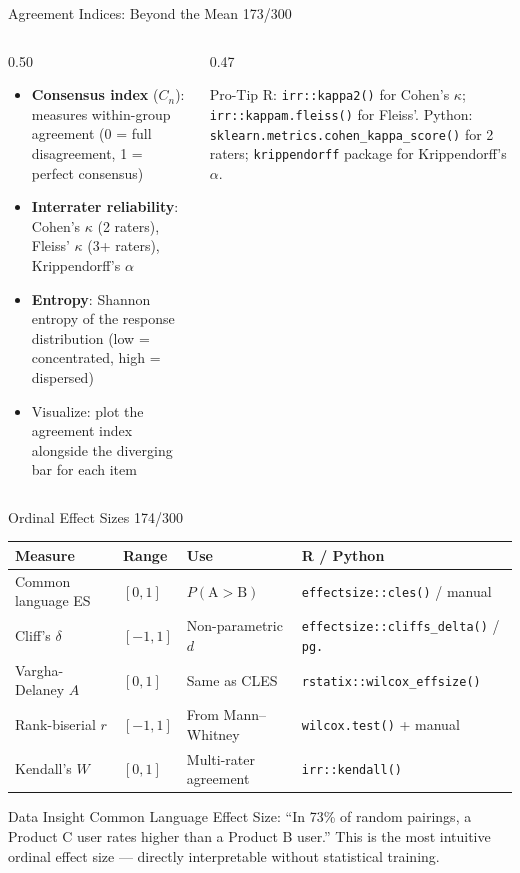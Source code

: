 \documentclass[10pt]{beamer}
\newcommand{\smark}[1]{\hfill{\scriptsize\color{codegray}#1}}
\begin{document}
\begin{frame}{Agreement Indices: Beyond the Mean}
\smark{173/300}
\begin{columns}[T]
\begin{column}{0.50\textwidth}
\begin{itemize}
    \item \textbf{Consensus index} ($C_n$): measures within-group agreement (0 = full disagreement, 1 = perfect consensus)
    \item \textbf{Interrater reliability}: Cohen's $\kappa$ (2 raters), Fleiss' $\kappa$ (3+ raters), Krippendorff's $\alpha$
    \item \textbf{Entropy}: Shannon entropy of the response distribution (low = concentrated, high = dispersed)
    \item Visualize: plot the agreement index alongside the diverging bar for each item
\end{itemize}
\end{column}
\begin{column}{0.47\textwidth}
\begin{alertblock}{Pro-Tip}
    \scriptsize R: \texttt{irr::kappa2()} for Cohen's $\kappa$; \texttt{irr::kappam.fleiss()} for Fleiss'. Python: \texttt{sklearn.metrics.cohen\_kappa\_score()} for 2 raters; \texttt{krippendorff} package for Krippendorff's $\alpha$.
\end{alertblock}
\end{column}
\end{columns}
\end{frame}

\begin{frame}{Ordinal Effect Sizes}
\smark{174/300}
\centering\small
\begin{tabular}{@{}llll@{}}
    \toprule
    \textbf{Measure} & \textbf{Range} & \textbf{Use} & \textbf{R / Python} \\
    \midrule
    Common language ES & $[0, 1]$  & $P(\text{A} > \text{B})$  & \texttt{effectsize::cles()} / manual \\
    Cliff's $\delta$   & $[-1, 1]$ & Non-parametric $d$       & \texttt{effectsize::cliffs\_delta()} / \texttt{pg.} \\
    Vargha-Delaney $A$ & $[0, 1]$  & Same as CLES             & \texttt{rstatix::wilcox\_effsize()} \\
    Rank-biserial $r$  & $[-1, 1]$ & From Mann--Whitney       & \texttt{wilcox.test()} + manual \\
    Kendall's $W$      & $[0, 1]$  & Multi-rater agreement    & \texttt{irr::kendall()} \\
    \bottomrule
\end{tabular}

\vspace{0.3cm}
\begin{exampleblock}{Data Insight}
    \scriptsize Common Language Effect Size: ``In 73\% of random pairings, a Product C user rates higher than a Product B user.'' This is the most intuitive ordinal effect size --- directly interpretable without statistical training.
\end{exampleblock}
\end{frame}
\end{document}
